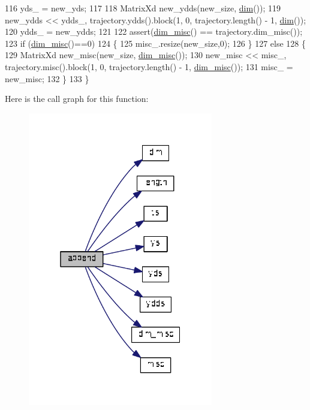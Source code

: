 \begin{DoxyCode}
116   yds\_ = new\_yds;
117 
118   MatrixXd new\_ydds(new\_size, \hyperlink{classDmpBbo_1_1Trajectory_a6f628f7f4ed9d77bf69f5b8560b98f18}{dim}());
119   new\_ydds << ydds\_, trajectory.ydds().block(1, 0, trajectory.length() - 1, \hyperlink{classDmpBbo_1_1Trajectory_a6f628f7f4ed9d77bf69f5b8560b98f18}{dim}());
120   ydds\_ = new\_ydds;
121   
122   assert(\hyperlink{classDmpBbo_1_1Trajectory_a54e86a99496037df2355a51d712f5d54}{dim\_misc}() == trajectory.dim\_misc());
123   \textcolor{keywordflow}{if} (\hyperlink{classDmpBbo_1_1Trajectory_a54e86a99496037df2355a51d712f5d54}{dim\_misc}()==0)
124   \{
125     misc\_.resize(new\_size,0);
126   \}
127   \textcolor{keywordflow}{else}
128   \{
129     MatrixXd new\_misc(new\_size, \hyperlink{classDmpBbo_1_1Trajectory_a54e86a99496037df2355a51d712f5d54}{dim\_misc}());
130     new\_misc << misc\_, trajectory.misc().block(1, 0, trajectory.length() - 1, 
      \hyperlink{classDmpBbo_1_1Trajectory_a54e86a99496037df2355a51d712f5d54}{dim\_misc}());
131     misc\_ = new\_misc;
132   \}
133 \}
\end{DoxyCode}


Here is the call graph for this function\+:
\nopagebreak
\begin{figure}[H]
\begin{center}
\leavevmode
\includegraphics[width=229pt]{classDmpBbo_1_1Trajectory_aac6f333ab80eb78ad2ff3cab4e8326ec_cgraph}
\end{center}
\end{figure}


